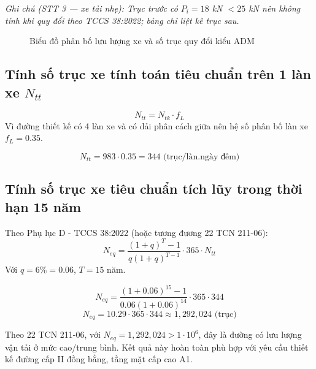 \noindent\textit{Ghi chú (STT 3 --- xe tải nhẹ): Trục trước có $P_i = 18$ kN $< 25$ kN nên không tính khi quy đổi theo TCCS 38:2022; bảng chỉ liệt kê trục sau.}

\begin{figure}[H]
    \centering
    \caption{Biểu đồ phân bố lưu lượng xe và số trục quy đổi kiểu ADM}
\end{figure}

\subsection{Tính số trục xe tính toán tiêu chuẩn trên 1 làn xe \texorpdfstring{$N_{tt}$}{Ntt}}
$$ N_{tt} = N_{tk} \cdot f_L $$
Vì đường thiết kế có 4 làn xe và có dải phân cách giữa nên hệ số phân bố làn xe $f_L = 0.35$.

$$ N_{tt} = 983 \cdot 0.35 = 344 \text{ (trục/làn.ngày đêm)} $$

\subsection{Tính số trục xe tiêu chuẩn tích lũy trong thời hạn 15 năm}
Theo Phụ lục D - TCCS 38:2022 (hoặc tương đương 22 TCN 211-06):
$$ N_{eq} = \frac{(1+q)^{T}-1}{q(1+q)^{T-1}} \cdot 365 \cdot N_{tt} $$
Với $q = 6\% = 0.06$, $T = 15$ năm.

$$ N_{eq} = \frac{(1+0.06)^{15}-1}{0.06(1+0.06)^{14}} \cdot 365 \cdot 344 $$
$$ N_{eq} = 10.29 \cdot 365 \cdot 344 \approx 1{,}292{,}024 \text{ (trục)} $$

Theo 22 TCN 211-06, với $N_{eq} = 1{,}292{,}024 > 1 \cdot 10^6$, đây là đường có lưu lượng vận tải ở mức cao/trung bình. Kết quả này hoàn toàn phù hợp với yêu cầu thiết kế đường cấp II đồng bằng, tầng mặt cấp cao A1.
